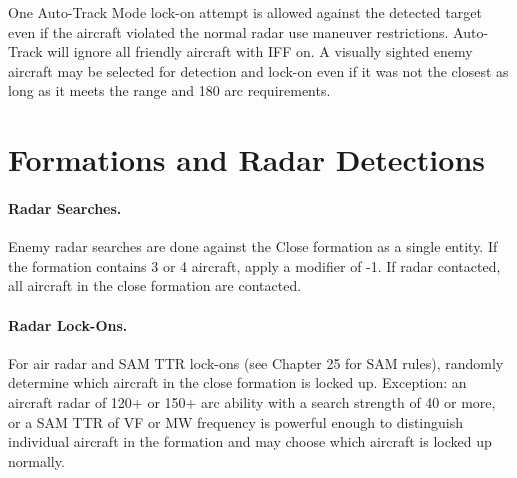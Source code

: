 \begin{advancedrules}
One Auto-Track Mode lock-on attempt is allowed against the detected target even if the aircraft violated the normal radar use maneuver restrictions. Auto-Track will ignore all friendly aircraft with IFF on. A visually sighted enemy aircraft may be selected for detection and lock-on  even if it was not the closest as long as it meets the range and 180{\deg} arc requirements. 


\section{Formations and Radar Detections}

\paragraph{Radar Searches.} Enemy radar searches are done against the Close formation as a single entity. If the formation contains 3 or 4 aircraft, apply a modifier of -1. If radar contacted, all aircraft in the close formation are contacted.

\paragraph{Radar Lock-Ons.} For air radar and SAM TTR lock-ons (see Chapter 25 for SAM rules), randomly determine which aircraft in the close formation is locked up. Exception: an aircraft radar of 120+ or 150+ arc ability with a search strength of 40 or more, or a SAM TTR of VF or MW frequency is powerful enough to distinguish individual aircraft in the formation and may choose which aircraft is locked up normally.

\end{advancedrules}
